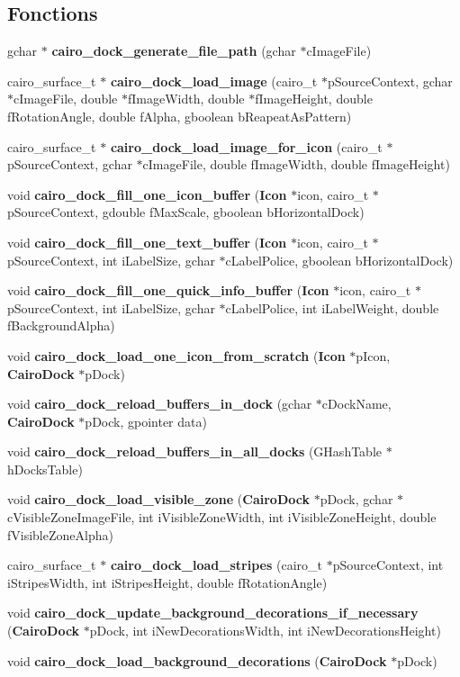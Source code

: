 \subsection*{Fonctions}
\begin{CompactItemize}
\item 
gchar $\ast$ {\bf cairo\_\-dock\_\-generate\_\-file\_\-path} (gchar $\ast$cImageFile)
\item 
cairo\_\-surface\_\-t $\ast$ {\bf cairo\_\-dock\_\-load\_\-image} (cairo\_\-t $\ast$pSourceContext, gchar $\ast$cImageFile, double $\ast$fImageWidth, double $\ast$fImageHeight, double fRotationAngle, double fAlpha, gboolean bReapeatAsPattern)
\item 
cairo\_\-surface\_\-t $\ast$ {\bf cairo\_\-dock\_\-load\_\-image\_\-for\_\-icon} (cairo\_\-t $\ast$pSourceContext, gchar $\ast$cImageFile, double fImageWidth, double fImageHeight)
\item 
void {\bf cairo\_\-dock\_\-fill\_\-one\_\-icon\_\-buffer} ({\bf Icon} $\ast$icon, cairo\_\-t $\ast$pSourceContext, gdouble fMaxScale, gboolean bHorizontalDock)
\item 
void {\bf cairo\_\-dock\_\-fill\_\-one\_\-text\_\-buffer} ({\bf Icon} $\ast$icon, cairo\_\-t $\ast$pSourceContext, int iLabelSize, gchar $\ast$cLabelPolice, gboolean bHorizontalDock)
\item 
void {\bf cairo\_\-dock\_\-fill\_\-one\_\-quick\_\-info\_\-buffer} ({\bf Icon} $\ast$icon, cairo\_\-t $\ast$pSourceContext, int iLabelSize, gchar $\ast$cLabelPolice, int iLabelWeight, double fBackgroundAlpha)
\item 
void {\bf cairo\_\-dock\_\-load\_\-one\_\-icon\_\-from\_\-scratch} ({\bf Icon} $\ast$pIcon, {\bf CairoDock} $\ast$pDock)
\item 
void {\bf cairo\_\-dock\_\-reload\_\-buffers\_\-in\_\-dock} (gchar $\ast$cDockName, {\bf CairoDock} $\ast$pDock, gpointer data)
\item 
void {\bf cairo\_\-dock\_\-reload\_\-buffers\_\-in\_\-all\_\-docks} (GHashTable $\ast$hDocksTable)
\item 
void {\bf cairo\_\-dock\_\-load\_\-visible\_\-zone} ({\bf CairoDock} $\ast$pDock, gchar $\ast$cVisibleZoneImageFile, int iVisibleZoneWidth, int iVisibleZoneHeight, double fVisibleZoneAlpha)
\item 
cairo\_\-surface\_\-t $\ast$ {\bf cairo\_\-dock\_\-load\_\-stripes} (cairo\_\-t $\ast$pSourceContext, int iStripesWidth, int iStripesHeight, double fRotationAngle)
\item 
void {\bf cairo\_\-dock\_\-update\_\-background\_\-decorations\_\-if\_\-necessary} ({\bf CairoDock} $\ast$pDock, int iNewDecorationsWidth, int iNewDecorationsHeight)
\item 
void {\bf cairo\_\-dock\_\-load\_\-background\_\-decorations} ({\bf CairoDock} $\ast$pDock)
\end{CompactItemize}


